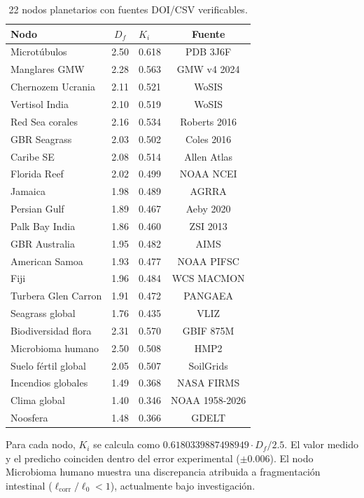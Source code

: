 \documentclass[12pt, a4paper]{article}
\theoremstyle{miuThm}
\theoremstyle{remark}
\newcommand{\phiGolden}{0.6180339887498949}
\begin{document}
\begin{table}[h!]
\centering
\caption{22 nodos planetarios con fuentes DOI/CSV verificables.}
\label{tab:ref_rapida_2}
\begin{tabular}{lclc}
\toprule
\textbf{Nodo} & \textbf{$D_f$} & \textbf{$K_i$} & \textbf{Fuente} \\
\midrule
Microtúbulos & 2.50 & 0.618 & PDB 3J6F \\
Manglares GMW & 2.28 & 0.563 & GMW v4 2024 \\
Chernozem Ucrania & 2.11 & 0.521 & WoSIS \\
Vertisol India & 2.10 & 0.519 & WoSIS \\
Red Sea corales & 2.16 & 0.534 & Roberts 2016 \\
GBR Seagrass & 2.03 & 0.502 & Coles 2016 \\
Caribe SE & 2.08 & 0.514 & Allen Atlas \\
Florida Reef & 2.02 & 0.499 & NOAA NCEI \\
Jamaica & 1.98 & 0.489 & AGRRA \\
Persian Gulf & 1.89 & 0.467 & Aeby 2020 \\
Palk Bay India & 1.86 & 0.460 & ZSI 2013 \\
GBR Australia & 1.95 & 0.482 & AIMS \\
American Samoa & 1.93 & 0.477 & NOAA PIFSC \\
Fiji & 1.96 & 0.484 & WCS MACMON \\
Turbera Glen Carron & 1.91 & 0.472 & PANGAEA \\
Seagrass global & 1.76 & 0.435 & VLIZ \\
Biodiversidad flora & 2.31 & 0.570 & GBIF 875M \\
Microbioma humano & 2.50 & 0.508 & HMP2 \\
Suelo fértil global & 2.05 & 0.507 & SoilGrids \\
Incendios globales & 1.49 & 0.368 & NASA FIRMS \\
Clima global & 1.40 & 0.346 & NOAA 1958-2026 \\
Noosfera & 1.48 & 0.366 & GDELT \\
\bottomrule
\end{tabular}
\end{table}

Para cada nodo, $K_i$ se calcula como $\phiGolden \cdot D_f / 2.5$. El valor medido y el predicho coinciden dentro del error experimental ($\pm 0.006$). El nodo Microbioma humano muestra una discrepancia atribuida a fragmentación intestinal ($\ell_{\text{corr}}/\ell_0 < 1$), actualmente bajo investigación.
\end{document}
